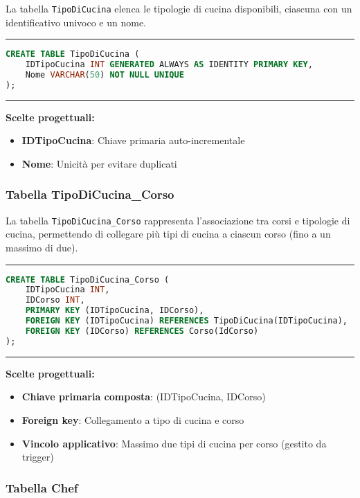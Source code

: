 La tabella \texttt{TipoDiCucina} elenca le tipologie di cucina disponibili, ciascuna con un identificativo univoco e un nome.

\noindent\rule{\textwidth}{0.4pt}
\begin{lstlisting}[language=SQL, style=sqlstyle]
CREATE TABLE TipoDiCucina (
    IDTipoCucina INT GENERATED ALWAYS AS IDENTITY PRIMARY KEY,
    Nome VARCHAR(50) NOT NULL UNIQUE
);
\end{lstlisting}
\noindent\rule{\textwidth}{0.4pt}

\textbf{Scelte progettuali:}
\begin{itemize}
    \item \textbf{IDTipoCucina}: Chiave primaria auto-incrementale
    \item \textbf{Nome}: Unicità per evitare duplicati
\end{itemize}

\subsubsection{Tabella TipoDiCucina\_Corso}

La tabella \texttt{TipoDiCucina\_Corso} rappresenta l'associazione tra corsi e tipologie di cucina, permettendo di collegare più tipi di cucina a ciascun corso (fino a un massimo di due).

\noindent\rule{\textwidth}{0.4pt}
\begin{lstlisting}[language=SQL, style=sqlstyle]
CREATE TABLE TipoDiCucina_Corso (
    IDTipoCucina INT,
    IDCorso INT,
    PRIMARY KEY (IDTipoCucina, IDCorso),
    FOREIGN KEY (IDTipoCucina) REFERENCES TipoDiCucina(IDTipoCucina),
    FOREIGN KEY (IDCorso) REFERENCES Corso(IdCorso)
);
\end{lstlisting}
\noindent\rule{\textwidth}{0.4pt}

\textbf{Scelte progettuali:}
\begin{itemize}
    \item \textbf{Chiave primaria composta}: (IDTipoCucina, IDCorso)
    \item \textbf{Foreign key}: Collegamento a tipo di cucina e corso
    \item \textbf{Vincolo applicativo}: Massimo due tipi di cucina per corso (gestito da trigger)
\end{itemize}

\subsubsection{Tabella Chef}


